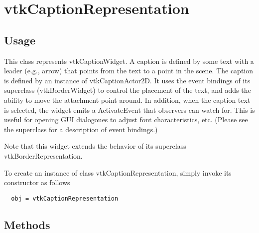 \section{vtkCaptionRepresentation}

\subsection{Usage}

 This class represents vtkCaptionWidget. A caption is defined by some text
 with a leader (e.g., arrow) that points from the text to a point in the
 scene. The caption is defined by an instance of vtkCaptionActor2D. It uses
 the event bindings of its superclass (vtkBorderWidget) to control the
 placement of the text, and adds the ability to move the attachment point
 around. In addition, when the caption text is selected, the widget emits a
 ActivateEvent that observers can watch for. This is useful for opening GUI
 dialogoues to adjust font characteristics, etc. (Please see the superclass
 for a description of event bindings.)

 Note that this widget extends the behavior of its superclass 
 vtkBorderRepresentation. 

To create an instance of class vtkCaptionRepresentation, simply
invoke its constructor as follows
\begin{verbatim}
  obj = vtkCaptionRepresentation
\end{verbatim}
\subsection{Methods}

